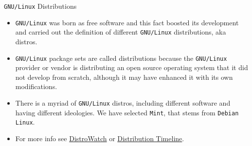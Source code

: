 \begin{frame}{\texttt{GNU/Linux} Distributions}
    \begin{itemize}
  \item {\footnotesize \texttt{GNU/Linux} was born as free software and this fact boosted its development and carried out the definition of different \texttt{GNU/Linux} distributions, aka distros.}

  \item {\footnotesize \texttt{GNU/Linux} package sets are called distributions because the \texttt{GNU/Linux} provider or  vendor is distributing an open source operating system that it did not develop from scratch, although it may have enhanced it with its own modifications.}

  \item {\footnotesize   There is a myriad of \texttt{GNU/Linux} distros, including different software and having different ideologies. We have selected \alert{\texttt{Mint}}, that stems from \texttt{Debian Linux}.}
  \item {\footnotesize  For more info see \href{http://distrowatch.com/}{DistroWatch} or \href{http://futurist.se/gldt/}{Distribution Timeline}.}
  \end{itemize}
\end{frame}
